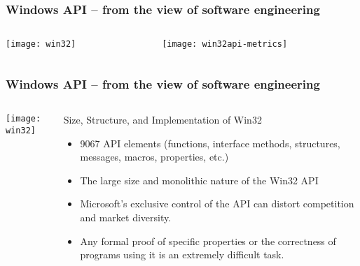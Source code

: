 \begin{frame}[plain]
	\frametitle{Windows API -- from the view of software engineering}
	
	
	
	\begin{columns}
		
		\begin{column}{.4\textwidth}
			
			\texttt{[image: win32]}
			
		\end{column}
		
		\begin{column}{.6\textwidth}
			
		\texttt{[image: win32api-metrics]}
			
		\end{column}
		
		
	\end{columns}
	
	
\end{frame}



\begin{frame}[plain]
	\frametitle{Windows API -- from the view of software engineering}
	
	
	
	\begin{columns}
		
		\begin{column}{.4\textwidth}
			
			\texttt{[image: win32]}
			
		\end{column}
		
		\begin{column}{.6\textwidth}
		
		Size, Structure, and Implementation of Win32
			
		\begin{itemize}
			\item 9067 API elements (functions, interface methods,
			structures, messages, macros, properties, etc.)
			\item The large size and monolithic nature of the Win32 API
			\item Microsoft’s exclusive control of the API can distort competition and market diversity.
			\item Any formal proof of
			specific properties or the correctness of programs using it is
			an extremely difficult task. 

		\end{itemize}

		\end{column}		
	\end{columns}
	
	
\end{frame}


